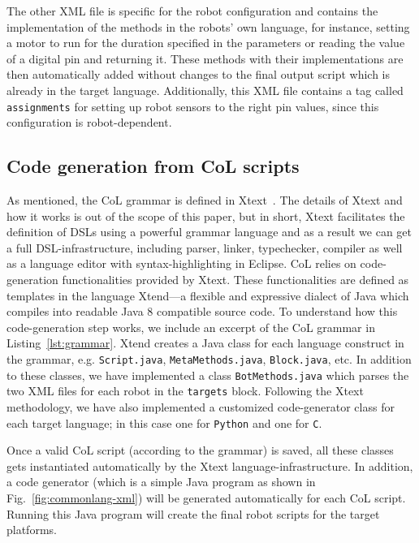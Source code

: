 \documentclass[runningheads]{llncs}
\begin{document}
The other XML file is specific for the robot configuration and contains the implementation of the methods in the robots’ own language, for instance, setting a motor to run for the duration specified in the parameters or reading the value of a digital pin and returning it. 
These methods with their implementations are then automatically added without changes to the final output script which is already in the target language. 
Additionally, this XML file contains a tag called \texttt{assignments} for setting up robot sensors to the right pin values, since this configuration is robot-dependent.

\subsection{Code generation from CoL scripts}

As mentioned, the CoL grammar is defined in Xtext~\cite{xtext}.
The details of Xtext and how it works is out of the scope of this paper, but in short, Xtext facilitates the definition of DSLs using a powerful grammar language and as a result we can get a full DSL-infrastructure, including parser, linker, typechecker, compiler as well as a language editor with syntax-highlighting in Eclipse.
CoL relies on code-generation functionalities provided by Xtext.
These functionalities are defined as templates in the language Xtend---a flexible and expressive dialect of Java which compiles into readable Java 8 compatible source code.
To understand how this code-generation step works, we include an excerpt of the CoL grammar in Listing~\ref{lst:grammar}.
Xtend creates a Java class for each language construct in the grammar, e.g. \texttt{Script.java}, \texttt{MetaMethods.java}, \texttt{Block.java}, etc.
In addition to these classes, we have implemented a class \texttt{BotMethods.java} which parses the two XML files for each robot in the \texttt{targets} block.
Following the Xtext methodology, we have also implemented a customized code-generator class for each target language; in this case one for \texttt{Python} and one for \texttt{C}.

Once a valid CoL script (according to the grammar) is saved, all these classes gets instantiated automatically by the Xtext language-infrastructure.
In addition, a code generator (which is a simple Java program as shown in Fig.~\ref{fig:commonlang-xml}) will be generated automatically for each CoL script.
Running this Java program will create the final robot scripts for the target platforms.
\end{document}
